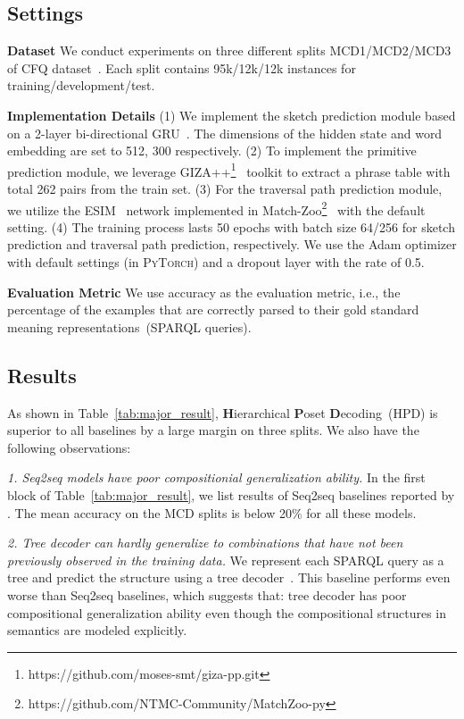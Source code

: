\documentclass{article}
\begin{document}
\subsection{Settings}
\textbf{Dataset}
We conduct experiments on three different splits MCD1/MCD2/MCD3 of CFQ dataset~\citep{keysers2020measuring}.
Each split contains 95k/12k/12k instances for training/development/test.

\textbf{Implementation Details}
(1) We implement the sketch prediction module based on a 2-layer bi-directional GRU~\citep{cho-etal-2014-learning}. The dimensions of the hidden state and word embedding are set to 512, 300 respectively.
(2) To implement the primitive prediction module,  we leverage \textsc{GIZA++}\footnote{https://github.com/moses-smt/giza-pp.git}~ \citep{och03:asc} toolkit to extract a phrase table with total 262 pairs from the train set.
(3) For the traversal path prediction module, we utilize the ESIM~\citep{chen2016enhanced} network implemented in Match-Zoo\footnote{https://github.com/NTMC-Community/MatchZoo-py}~\citep{Guo:2019:MLP:3331184.3331403} with the default setting.
(4) The training  process lasts 50 epochs with batch size 64/256 for sketch prediction and traversal path prediction, respectively. We use the Adam optimizer with default settings (in \textsc{PyTorch}) and a dropout layer with the rate of 0.5. 

\textbf{Evaluation Metric}
We use accuracy as the evaluation metric, i.e., the percentage of the examples that are correctly parsed to their gold standard meaning  representations~(SPARQL queries).



\subsection{Results}
As shown in Table~\ref{tab:major_result}, \textbf{H}ierarchical \textbf{P}oset \textbf{D}ecoding~(HPD) is superior to all baselines by a large margin on three splits. We also have the following observations:


\emph{1. Seq2seq models have poor compositionial generalization ability.} In the first block of Table~\ref{tab:major_result}, we list results of Seq2seq baselines reported by \citet{keysers2020measuring}. The mean accuracy on the MCD splits is below 20\% for all these models.


\emph{2. Tree decoder can hardly generalize to combinations that have not been previously observed in the training data.} We represent each SPARQL query as a tree and predict the structure using a tree decoder~\citep{dong-lapata-2016-language}. This baseline performs even worse than Seq2seq baselines, which suggests that: tree decoder has poor compositional generalization ability even though the compositional structures in semantics are modeled explicitly.
\end{document}
